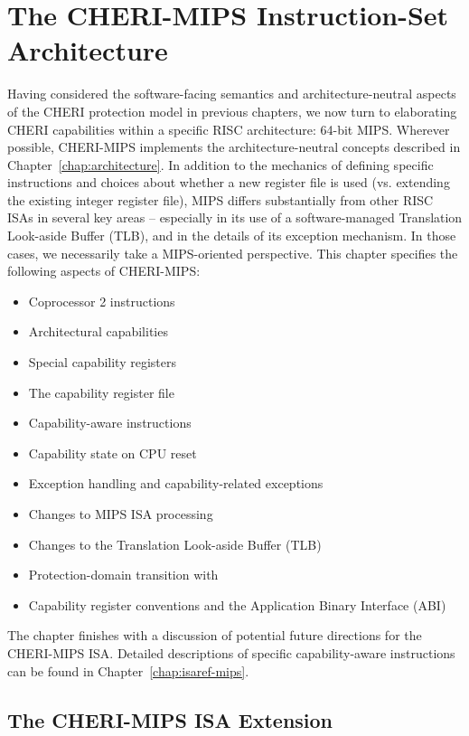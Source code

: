 \chapter{The CHERI-MIPS Instruction-Set Architecture}
\label{chap:cheri-mips}

Having considered the software-facing semantics and architecture-neutral
aspects of the CHERI protection model in previous chapters, we now turn to
elaborating CHERI capabilities within a specific RISC architecture: 64-bit
MIPS.
Wherever possible, CHERI-MIPS implements the architecture-neutral concepts
described in Chapter~\ref{chap:architecture}.
In addition to the mechanics of defining specific instructions and choices
about whether a new register file is used (vs. extending the existing integer
register file), MIPS differs substantially from other RISC ISAs in several
key areas -- especially in its use of a software-managed Translation Look-aside
Buffer (TLB), and in the details of its exception mechanism.
In those cases, we necessarily take a MIPS-oriented perspective.
This chapter specifies the following aspects of CHERI-MIPS:

\begin{itemize}
\item Coprocessor 2 instructions
\item Architectural capabilities
\item Special capability registers
\item The capability register file
\item Capability-aware instructions
\item Capability state on CPU reset
\item Exception handling and capability-related exceptions
\item Changes to MIPS ISA processing
\item Changes to the Translation Look-aside Buffer (TLB)
\item Protection-domain transition with 
\item Capability register conventions and the Application Binary Interface (ABI)
\end{itemize}

\noindent
The chapter finishes with a discussion of potential future directions for
the CHERI-MIPS ISA.
Detailed descriptions of specific capability-aware instructions can be found
in Chapter~\ref{chap:isaref-mips}.

\section{The CHERI-MIPS ISA Extension}

